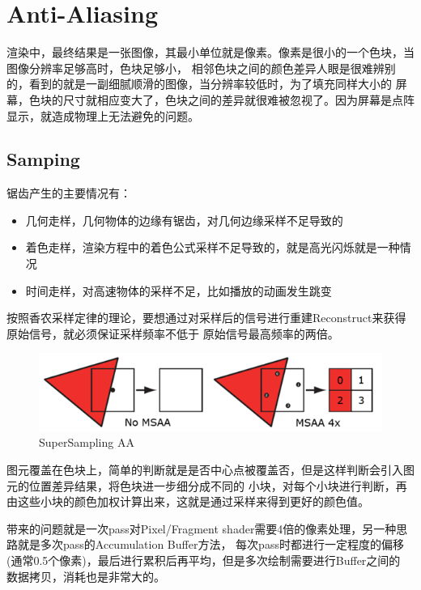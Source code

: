 \section{Anti-Aliasing}

渲染中，最终结果是一张图像，其最小单位就是像素。像素是很小的一个色块，当图像分辨率足够高时，色块足够小，
相邻色块之间的颜色差异人眼是很难辨别的，看到的就是一副细腻顺滑的图像，当分辨率较低时，为了填充同样大小的
屏幕，色块的尺寸就相应变大了，色块之间的差异就很难被忽视了。因为屏幕是点阵显示，就造成物理上无法避免的问题。

\subsection{Samping}

锯齿产生的主要情况有：
\begin{itemize}
    \item {几何走样，几何物体的边缘有锯齿，对几何边缘采样不足导致的}
    \item {着色走样，渲染方程中的着色公式采样不足导致的，就是高光闪烁就是一种情况}
    \item {时间走样，对高速物体的采样不足，比如播放的动画发生跳变}
\end{itemize}

按照香农采样定律的理论，要想通过对采样后的信号进行重建Reconstruct来获得原始信号，就必须保证采样频率不低于
原始信号最高频率的两倍。

\begin{figure}[h]
    \centering
    \includegraphics[width=\textwidth]{images/ssaa.png}
    \caption{SuperSampling AA}
\end{figure}

图元覆盖在色块上，简单的判断就是是否中心点被覆盖否，但是这样判断会引入图元的位置差异结果，将色块进一步细分成不同的
小块，对每个小块进行判断，再由这些小块的颜色加权计算出来，这就是通过采样来得到更好的颜色值。

带来的问题就是一次pass对Pixel/Fragment shader需要4倍的像素处理，另一种思路就是多次pass的Accumulation Buffer方法，
每次pass时都进行一定程度的偏移(通常0.5个像素)，最后进行累积后再平均，但是多次绘制需要进行Buffer之间的
数据拷贝，消耗也是非常大的。


